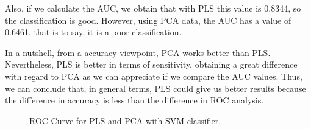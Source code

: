 Also, if we calculate the AUC, we obtain that with PLS this value is 0.8344, so the classification is good. However, using PCA data, the AUC has a value of 0.6461, that is to say, it is a poor classification.

In a nutshell, from a accuracy viewpoint, PCA works better than PLS. Nevertheless, PLS is better in terms of sensitivity, obtaining a great difference with regard to PCA as we can appreciate if we compare the AUC values. Thus, we can conclude that, in general terms, PLS could give us better results because the difference in accuracy is less than the difference in ROC analysis.

\begin{figure}[H]
	\centering
	\caption{ROC Curve for PLS and PCA with SVM classifier.}
	\label{fig:ROC}
\end{figure}

 

